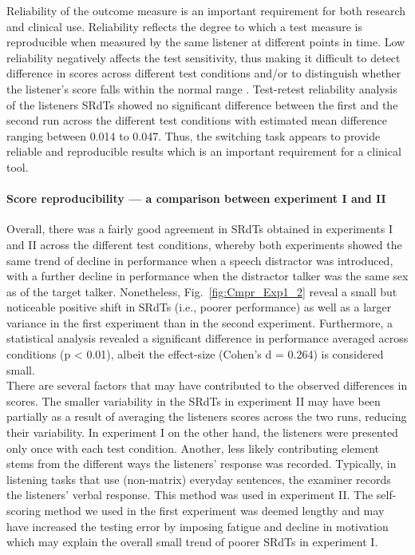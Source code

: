 \documentclass[a4paper, twoside]{templates/ociamthesis}
\begin{document}
Reliability of the outcome measure is an important requirement for both research and clinical use. Reliability reflects the degree to which a test measure is reproducible when measured by the same listener at different points in time. Low reliability negatively affects the test sensitivity, thus making it difficult to detect difference in scores across different test conditions and/or to distinguish whether the listener's score falls within the normal range \autocite{Cameron2007}.
Test-retest reliability analysis of the listeners SRdTs showed no significant difference between the first and the second run across the different test conditions with estimated mean difference ranging between 0.014 to 0.047. Thus, the switching task appears to provide reliable and reproducible results which is an important requirement for a clinical tool.\\

\hypertarget{score-reproducibility-a-comparison-between-experiment-i-and-ii-1}{%
\paragraph{Score reproducibility --- a comparison between experiment I and II}\label{score-reproducibility-a-comparison-between-experiment-i-and-ii-1}}

Overall, there was a fairly good agreement in SRdTs obtained in experiments I and II across the different test conditions, whereby both experiments showed the same trend of decline in performance when a speech distractor was introduced, with a further decline in performance when the distractor talker was the same sex as of the target talker. Nonetheless, Fig.~\ref{fig:Cmpr_Exp1_2} reveal a small but noticeable positive shift in SRdTs (i.e., poorer performance) as well as a larger variance in the first experiment than in the second experiment. Furthermore, a statistical analysis revealed a significant difference in performance averaged across conditions (p \textless{} 0.01), albeit the effect-size (Cohen's d = 0.264) is considered small.\\

There are several factors that may have contributed to the observed differences in scores. The smaller variability in the SRdTs in experiment II may have been partially as a result of averaging the listeners scores across the two runs, reducing their variability. In experiment I on the other hand, the listeners were presented only once with each test condition. Another, less likely contributing element stems from the different ways the listeners' response was recorded. Typically, in listening tasks that use (non-matrix) everyday sentences, the examiner records the listeners' verbal response. This method was used in experiment II. The self-scoring method we used in the first experiment was deemed lengthy and may have increased the testing error by imposing fatigue and decline in motivation which may explain the overall small trend of poorer SRdTs in experiment I.\\
\end{document}

